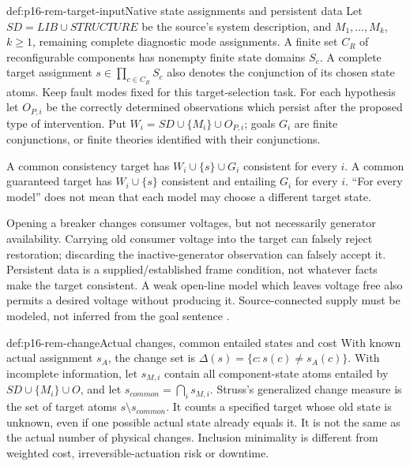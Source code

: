 \begin{hbdefinition}{def:p16-rem-target-input}{Native state assignments and persistent data}
Let \(SD=LIB\cup STRUCTURE\) be the source's system description,
and \(M_1,\ldots,M_k\), \(k\ge1\), remaining complete diagnostic
mode assignments. A finite set \(C_R\) of reconfigurable components has
nonempty finite state domains \(S_c\). A complete target assignment
\(s\in\prod_{c\in C_R}S_c\) also denotes the conjunction of its
chosen state atoms. Keep fault modes fixed for this target-selection task.
For each hypothesis let \(O_{P,i}\) be the correctly determined observations
which persist after the proposed type of intervention. Put
\(W_i=SD\cup\{M_i\}\cup O_{P,i}\); goals \(G_i\) are finite
conjunctions, or finite theories identified with their conjunctions.

A common consistency target has \(W_i\cup\{s\}\cup G_i\) consistent
for every \(i\). A common guaranteed target has \(W_i\cup\{s\}\)
consistent and entailing \(G_i\) for every \(i\). ``For every model''
does not mean that each model may choose a different target state.
\end{hbdefinition}

Opening a breaker changes consumer voltages, but not necessarily generator
availability. Carrying old consumer voltage into the target can falsely
reject restoration; discarding the inactive-generator observation can falsely
accept it. Persistent data is a supplied/established frame condition, not
whatever facts make the target consistent. A weak open-line model which
leaves voltage free also permits a desired voltage without producing it.
Source-connected supply must be modeled, not inferred from the goal sentence
\cite[pp.~450--452]{Struss2008ModelBasedProblemSolving}.

\begin{hbdefinition}{def:p16-rem-change}{Actual changes, common entailed states and cost}
With known actual assignment \(s_A\), the change set is
\(\Delta(s)=\{c:s(c)\ne s_A(c)\}\).
With incomplete information, let \(s_{M,i}\) contain all component-state
atoms entailed by \(SD\cup\{M_i\}\cup O\), and let
\(s_{common}=\bigcap_i s_{M,i}\). Struss's generalized change measure
is the set of target atoms \(s\setminus s_{common}\).
It counts a specified target whose old state is unknown, even if one
possible actual state already equals it. It is not the same as the actual
number of physical changes. Inclusion minimality is different from weighted
cost, irreversible-actuation risk or downtime.
\end{hbdefinition}

